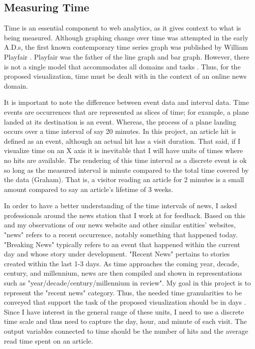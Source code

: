 \documentclass[12pt]{article}
\begin{document}
\subsection{Measuring Time}
Time is an essential component to web analytics, as it gives context to what is being measured. Although graphing change over time was attempted in the early A.D.s, the first known contemporary time series graph was published by William Playfair \cite{playfair}. Playfair was the father of the line graph and bar graph. However, there is not a single model that accommodates all domains and tasks \cite{frank}. Thus, for the proposed visualization, time must be dealt with in the context of an online news domain.   

It is important to note the difference between event data and interval data. Time events are occurrences that are represented as slices of time; for example, a plane landed at its destination is an event. Whereas, the process of a plane landing occurs over a time interval of say 20 minutes. In this project, an article hit is defined as an event, although an actual hit has a visit duration. That said, if I visualize time on an X axis it is inevitable that I will have units of times where no hits are available. The rendering of this time interval as a discrete event is ok so long as the measured interval is minute compared to the total time covered by the data (Graham). That is, a visitor reading an article for 2 minutes is a small amount compared to say an article's lifetime of 3 weeks. 

In order to have a better understanding of the time intervals of news, I asked professionals around the news station that I work at for feedback. Based on this and my observations of our news website and other similar entities' websites, "news" refers to a recent occurrence, notably something that happened today. "Breaking News" typically refers to an event that happened within the current day and whose story under development. "Recent News" pertains to stories created within the last 1-3 days. As time approaches the coming year, decade, century, and millennium, news are then compiled and shown in representations such as "year/decade/century/millennium in review". My goal in this project is to represent the "recent news" category. Thus, the needed time granularities to be conveyed that support the task of the proposed visualization should be in days \cite{bettini}. Since I have interest in the general range of these units, I need to use a discrete time scale \cite{goralwalla} and thus need to capture the day, hour, and minute of each visit. The output variables connected to time should be the number of hits and the average read time spent on an article.
\end{document}
